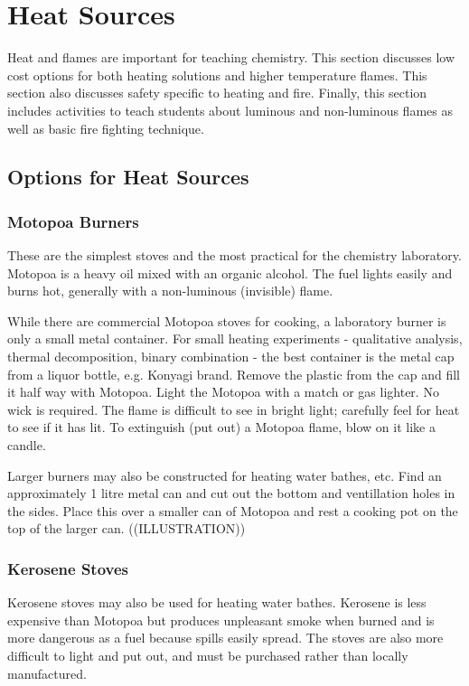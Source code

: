 \section{Heat Sources}

Heat and flames are important for teaching chemistry. This section discusses low cost options for both heating solutions and higher temperature flames. This section also discusses safety specific to heating and fire. Finally, this section includes activities to teach students about luminous and non-luminous flames as well as basic fire fighting technique.

\subsection{Options for Heat Sources}

\subsubsection{Motopoa Burners}

These are the simplest stoves and the most practical for the chemistry laboratory. Motopoa is a heavy oil mixed with an organic alcohol. The fuel lights easily and burns hot, generally with a non-luminous (invisible) flame.

While there are commercial Motopoa stoves for cooking, a laboratory burner is only a small metal container. For small heating experiments - qualitative analysis, thermal decomposition, binary combination - the best container is the metal cap from a liquor bottle, e.g. Konyagi brand. Remove the plastic from the cap and fill it half way with Motopoa. Light the Motopoa with a match or gas lighter. No wick is required. The flame is difficult to see in bright light; carefully feel for heat to see if it has lit. To extinguish (put out) a Motopoa flame, blow on it like a candle.

Larger burners may also be constructed for heating water bathes, etc. Find an approximately 1 litre metal can and cut out the bottom and ventillation holes in the sides. Place this over a smaller can of Motopoa and rest a cooking pot on the top of the larger can. ((ILLUSTRATION))

\subsubsection{Kerosene Stoves}

Kerosene stoves may also be used for heating water bathes. Kerosene is less expensive than Motopoa but produces unpleasant smoke when burned and is more dangerous as a fuel because spills easily spread. The stoves are also more difficult to light and put out, and must be purchased rather than locally manufactured.

